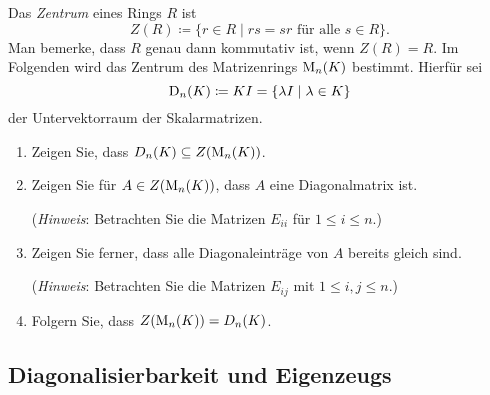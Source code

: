 \begin{question}
  Das \emph{Zentrum} eines Rings $R$ ist
  \[
    Z(R) \coloneqq \{ r \in R \mid \text{$rs = sr$ für alle $s \in R$} \}.
  \]
  Man bemerke, dass $R$ genau dann kommutativ ist, wenn $Z(R) = R$.
  Im Folgenden wird das Zentrum des Matrizenrings $\operatorname{M}_n(K)$ bestimmt.
  Hierfür sei
  \[
              \operatorname{D}_n(K)
    \coloneqq K I
    =         \{\lambda I \mid \lambda \in K\}
  \]
  der Untervektorraum der Skalarmatrizen.
  \begin{enumerate}[leftmargin=*]
    \item
      Zeigen Sie, dass $D_n(K) \subseteq Z(\operatorname{M}_n(K))$.
    \item
      Zeigen Sie für $A \in Z(\operatorname{M}_n(K))$, dass $A$ eine Diagonalmatrix ist.
      
      (\emph{Hinweis}:
       Betrachten Sie die Matrizen $E_{ii}$ für $1 \leq i \leq n$.)
    \item
      Zeigen Sie ferner, dass alle Diagonaleinträge von $A$ bereits gleich sind.
      
      (\emph{Hinweis}:
       Betrachten Sie die Matrizen $E_{ij}$ mit $1 \leq i,j \leq n$.)
    \item
      Folgern Sie, dass $Z(\operatorname{M}_n(K)) = D_n(K)$.
  \end{enumerate}
\end{question}










\subsection{Diagonalisierbarkeit und Eigenzeugs}


